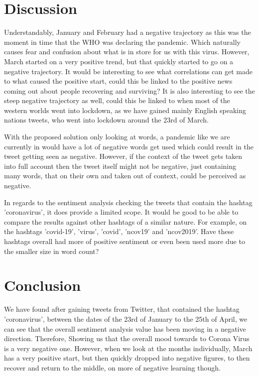 \documentclass[a4paper,10pt]{article}
\begin{document}
	\section{Discussion}
	
	Understandably, January and February had a negative trajectory as this was the moment in time that the WHO was declaring the pandemic. Which naturally causes fear and confusion about what is in store for us with this virus. However, March started on a very positive trend, but that quickly started to go on a negative trajectory. It would be interesting to see what correlations can get made to what caused the positive start, could this be linked to the positive news coming out about people recovering and surviving? It is also interesting to see the steep negative trajectory as well, could this be linked to when most of the western worlds went into lockdown, as we have gained mainly English speaking nations tweets, who went into lockdown around the 23rd of March.
	
	With the proposed solution only looking at words, a pandemic like we are currently in would have a lot of negative words get used which could result in the tweet getting seen as negative. However, if the context of the tweet gets taken into full account then the tweet itself might not be negative, just containing many words, that on their own and taken out of context, could be perceived as negative.
	
	In regards to the sentiment analysis checking the tweets that contain the hashtag 'coronavirus', it does provide a limited scope. It would be good to be able to compare the results against other hashtags of a similar nature. For example, on the hashtags 'covid-19', 'virus', 'covid', 'ncov19' and 'ncov2019'. Have these hashtags overall had more of positive sentiment or even been used more due to the smaller size in word count?
	
	\section{Conclusion}
	We have found after gaining tweets from Twitter, that contained the hashtag 'coronavirus', between the dates of the 23rd of January to the 25th of April, we can see that the overall sentiment analysis value has been moving in a negative direction. Therefore, Showing us that the overall mood towards to Corona Virus is a very negative one. However, when we look at the months individually, March has a very positive start, but then quickly dropped into negative figures, to then recover and return to the middle, on more of negative learning though.
	
\end{document}
